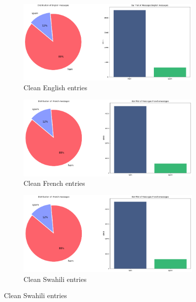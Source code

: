 \documentclass[12pt,a4paper, oneside]{book}
\begin{document}
\begin{figure}
	\centering
\begin{subfigure}{5cm}
	\includegraphics[width=01\linewidth]{CollectImages/EnglishPlot} 
	\caption{Clean English entries }
	\label{cleanEnglishEntrie}
\end{subfigure}
	\centering
\begin{subfigure}{5cm}
	\centering
	\includegraphics[width=01\linewidth]{CollectImages/frenchPlot} 
	\caption{Clean French entries }
	\label{cleanFrenchEntrie}
\end{subfigure}
	\centering
\begin{subfigure}{5cm}
	\centering
	\includegraphics[width=01\linewidth]{CollectImages/frenchPlot} 
	\caption{Clean Swahili entries }
	\label{cleanSwahiliEntrie}
\end{subfigure}
	
\end{figure} 
\end{document}
